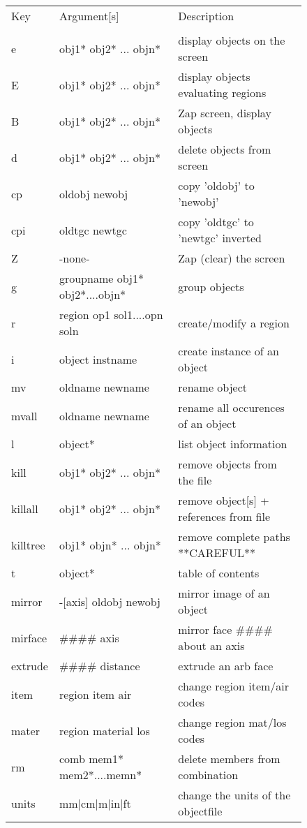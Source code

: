 \begin{figure}[tb]
\begin{tabular}{l l l}
Key	& Argument[s]	& Description \\
\\
  e	& obj1* obj2* ... objn*	& display objects on the screen \\
  E	& obj1* obj2* ... objn*	& display objects evaluating regions \\
  B	& obj1* obj2* ... objn*	& Zap screen, display objects \\
  d	& obj1* obj2* ... objn*	& delete objects from screen \\
  cp	& oldobj newobj	& copy 'oldobj' to 'newobj' \\
  cpi	& oldtgc newtgc	& copy 'oldtgc' to 'newtgc' inverted \\
  Z	& -none-	& Zap (clear) the screen \\
  g	& groupname obj1* obj2*....objn*	& group objects \\
  r	& region op1 sol1....opn soln	& create/modify a region \\
  i	& object instname	& create instance of an object \\
  mv	& oldname newname	& rename object \\
  mvall	& oldname newname	& rename all occurences of an object \\
  l	& object*	& list object information \\
  kill	& obj1* obj2* ... objn*	& remove objects from the file \\
  killall	& obj1* obj2* ... objn*	& remove object[s] + references from file \\
  killtree	& obj1* objn* ... objn*	& remove complete paths  **CAREFUL** \\
  t	& object*	& table of contents \\
  mirror	& -[axis] oldobj newobj	& mirror image of an object \\
  mirface	& \#\#\#\# axis	& mirror face \#\#\#\# about an axis \\
  extrude	& \#\#\#\# distance	& extrude an arb face \\
  item	& region item air	& change region item/air codes \\
  mater	& region material los	& change region mat/los codes \\
  rm	& comb mem1* mem2*....memn*	& delete members from combination \\
  units	& mm|cm|m|in|ft	& change the units of the objectfile \\

\end{tabular}
\end{figure}
